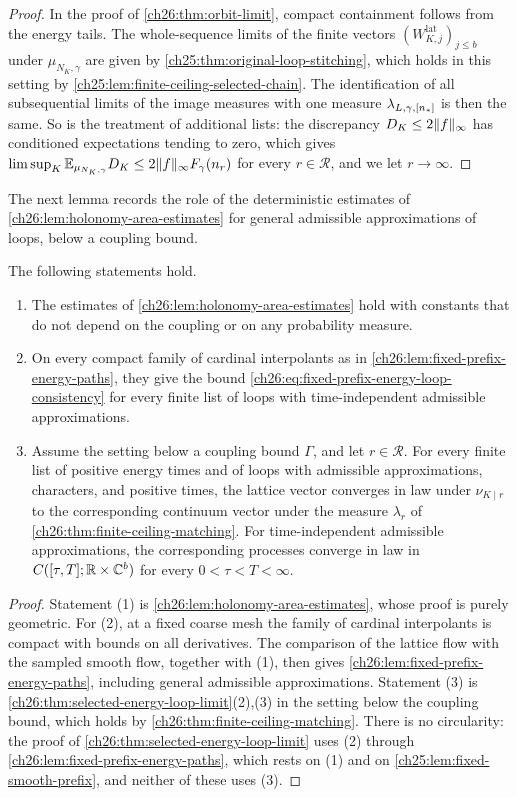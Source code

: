 \begin{proof}
In the proof of \cref{ch26:thm:orbit-limit}, compact containment follows from the energy tails. The whole-sequence limits of the finite vectors $(W^{\mathrm{lat}}_{K,j})_{j\le b}$ under $\mu_{N_K,\gamma}$ are given by \cref{ch25:thm:original-loop-stitching}, which holds in this setting by \cref{ch25:lem:finite-ceiling-selected-chain}. The identification of all subsequential limits of the image measures with one measure $\lambda_{L,\gamma,[n_*]}$ is then the same. So is the treatment of additional lists: the discrepancy $D_K\le2\lVert f\rVert_\infty$ has conditioned expectations tending to zero, which gives $\limsup_K\mathbb E_{\mu_{N_K,\gamma}}D_K\le2\lVert f\rVert_\infty F_\gamma(n_r)$ for every $r\in\mathcal R$, and we let $r\to\infty$.
\end{proof}

The next lemma records the role of the deterministic estimates of \cref{ch26:lem:holonomy-area-estimates} for general admissible approximations of loops, below a coupling bound.

\begin{lemma}\label{ch26:lem:vanishing-area-selected-passage}
The following statements hold.
\begin{enumerate}
\item The estimates of \cref{ch26:lem:holonomy-area-estimates} hold with constants that do not depend on the coupling or on any probability measure.
\item On every compact family of cardinal interpolants as in \cref{ch26:lem:fixed-prefix-energy-paths}, they give the bound \eqref{ch26:eq:fixed-prefix-energy-loop-consistency} for every finite list of loops with time-independent admissible approximations.
\item Assume the setting below a coupling bound $\Gamma$, and let $r\in\mathcal R$. For every finite list of positive energy times and of loops with admissible approximations, characters, and positive times, the lattice vector converges in law under $\nu_{K\mid r}$ to the corresponding continuum vector under the measure $\lambda_r$ of \cref{ch26:thm:finite-ceiling-matching}. For time-independent admissible approximations, the corresponding processes converge in law in $C([\tau,T];\mathbb R\times\mathbb C^b)$ for every $0<\tau<T<\infty$.
\end{enumerate}
\end{lemma}

\begin{proof}
Statement (1) is \cref{ch26:lem:holonomy-area-estimates}, whose proof is purely geometric. For (2), at a fixed coarse mesh the family of cardinal interpolants is compact with bounds on all derivatives. The comparison of the lattice flow with the sampled smooth flow, together with (1), then gives \cref{ch26:lem:fixed-prefix-energy-paths}, including general admissible approximations. Statement (3) is \cref{ch26:thm:selected-energy-loop-limit}(2),(3) in the setting below the coupling bound, which holds by \cref{ch26:thm:finite-ceiling-matching}. There is no circularity: the proof of \cref{ch26:thm:selected-energy-loop-limit} uses (2) through \cref{ch26:lem:fixed-prefix-energy-paths}, which rests on (1) and on \cref{ch25:lem:fixed-smooth-prefix}, and neither of these uses (3).
\end{proof}


